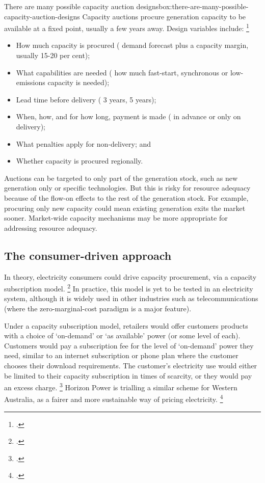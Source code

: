 \documentclass[FrontPage]{grattan}
\begin{document}
\begin{smallbox}{There are many possible capacity auction designs}{box:there-are-many-possible-capacity-auction-designs}
Capacity auctions procure generation capacity to be available at a fixed point, usually a few years away. Design variables include:%
\footcite{CIGRE2016CapacityMechanisms}
\begin{itemize}
    \item How much capacity is procured (\eg{} demand forecast plus a capacity margin, usually 15-20 per cent);
    \item What capabilities are needed (\eg{} how much fast-start, synchronous or low-emissions capacity is needed);
    \item Lead time before delivery (\eg{} 3 years, 5 years);
    \item When, how, and for how long, payment is made (\eg{} in advance or only on delivery);
    \item What penalties apply for non-delivery; and
    \item Whether capacity is procured regionally.
\end{itemize}

Auctions can be targeted to only part of the generation stock, such as new generation only or specific technologies. But this is risky for resource adequacy because of the flow-on effects to the rest of the generation stock. For example, procuring only new capacity could mean existing generation exits the market sooner. Market-wide capacity mechanisms may be more appropriate for addressing resource adequacy.
\end{smallbox}

\subsection{The consumer-driven approach}\label{subsec:the-consumer-led-approach}
In theory, electricity consumers could drive capacity procurement, via a capacity subscription model.%
\footcite{CIGRE2016CapacityMechanisms}
In practice, this model is yet to be tested in an electricity system, although it is widely used in other industries such as telecommunications (where the zero-marginal-cost paradigm is a major feature).

Under a capacity subscription model, retailers would offer customers products with a choice of `on-demand' or `as available' power (or some level of each). Customers would pay a subscription fee for the level of `on-demand' power they need, similar to an internet subscription or phone plan where the customer chooses their download requirements. The customer's electricity use would either be limited to their capacity subscription in times of scarcity, or they would pay an excess charge.%
\footcite{CIGRE2016CapacityMechanisms}
Horizon Power is trialling a similar scheme for Western Australia, as a fairer and more sustainable way of pricing electricity.%
\footcites{WoodBlowers-2015-Fair-pricing-for-WA}{Horizon2016CostReflectivePilot}
\end{document}
